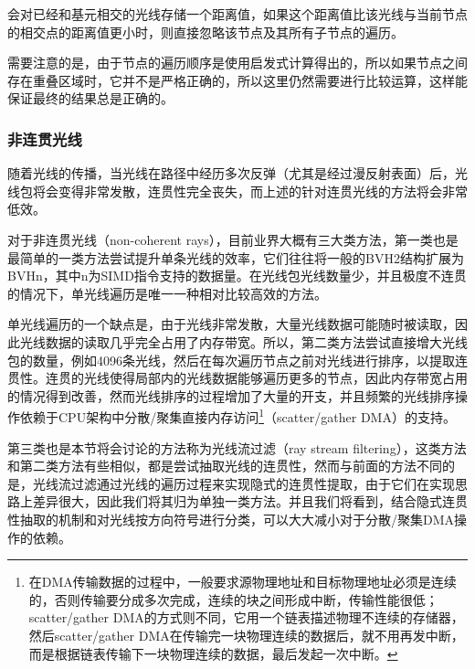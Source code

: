 \cite{a:EfficientRayTracingKernelsforModernCPUArchitectures}会对已经和基元相交的光线存储一个距离值，如果这个距离值比该光线与当前节点的相交点的距离值更小时，则直接忽略该节点及其所有子节点的遍历。

需要注意的是，由于节点的遍历顺序是使用启发式计算得出的，所以如果节点之间存在重叠区域时，它并不是严格正确的，所以这里仍然需要进行比较运算，这样能保证最终的结果总是正确的。







\subsubsection{非连贯光线}
随着光线的传播，当光线在路径中经历多次反弹（尤其是经过漫反射表面）后，光线包将会变得非常发散，连贯性完全丧失，而上述的针对连贯光线的方法将会非常低效。

对于非连贯光线（non-coherent rays），目前业界大概有三大类方法，第一类也是最简单的一类方法尝试提升单条光线的效率，它们往往将一般的BVH2结构扩展为BVHn，其中n为SIMD指令支持的数据量。在光线包光线数量少，并且极度不连贯的情况下，单光线遍历是唯一一种相对比较高效的方法。

单光线遍历的一个缺点是，由于光线非常发散，大量光线数据可能随时被读取，因此光线数据的读取几乎完全占用了内存带宽。所以，第二类方法尝试直接增大光线包的数量，例如4096条光线，然后在每次遍历节点之前对光线进行排序，以提取连贯性。连贯的光线使得局部内的光线数据能够遍历更多的节点，因此内存带宽占用的情况得到改善，然而光线排序的过程增加了大量的开支，并且频繁的光线排序操作依赖于CPU架构中分散/聚集直接内存访问\footnote{在DMA传输数据的过程中，一般要求源物理地址和目标物理地址必须是连续的，否则传输要分成多次完成，连续的块之间形成中断，传输性能很低；scatter/gather DMA的方式则不同，它用一个链表描述物理不连续的存储器，然后scatter/gather DMA在传输完一块物理连续的数据后，就不用再发中断，而是根据链表传输下一块物理连续的数据，最后发起一次中断。}（scatter/gather DMA）的支持。

第三类也是本节将会讨论的方法称为光线流过滤（ray stream filtering）\cite{a:DynamicRayStreamTraversal,a:EfficientRayTracingKernelsforModernCPUArchitectures}，这类方法和第二类方法有些相似，都是尝试抽取光线的连贯性，然而与前面的方法不同的是，光线流过滤通过光线的遍历过程来实现隐式的连贯性提取，由于它们在实现思路上差异很大，因此我们将其归为单独一类方法。并且我们将看到，结合隐式连贯性抽取的机制和对光线按方向符号进行分类，可以大大减小对于分散/聚集DMA操作的依赖。






